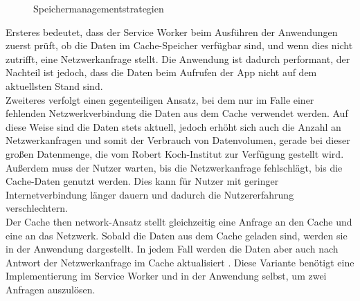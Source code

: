 \begin{figure}
\centering
\caption{Speichermanagementstrategien}
\end{figure}

Ersteres bedeutet, dass der Service Worker beim Ausführen der Anwendungen zuerst prüft, ob die Daten im Cache-Speicher verfügbar sind, und wenn dies nicht zutrifft, eine Netzwerkanfrage stellt.
Die Anwendung ist dadurch performant, der Nachteil ist jedoch, dass die Daten beim Aufrufen der App nicht auf dem aktuellsten Stand sind.\\
Zweiteres verfolgt einen gegenteiligen Ansatz, bei dem nur im Falle einer fehlenden Netzwerkverbindung die Daten aus dem Cache verwendet werden.
Auf diese Weise sind die Daten stets aktuell, jedoch erhöht sich auch die Anzahl an Netzwerkanfragen und somit der Verbrauch von Datenvolumen, gerade bei dieser großen Datenmenge, die vom Robert Koch-Institut zur Verfügung gestellt wird.
Außerdem muss der Nutzer warten, bis die Netzwerkanfrage fehlschlägt, bis die Cache-Daten genutzt werden.
Dies kann für Nutzer mit geringer Internetverbindung länger dauern und dadurch die Nutzererfahrung verschlechtern.\\
Der \glqq Cache then network\grqq{}-Ansatz stellt gleichzeitig eine Anfrage an den Cache und eine an das Netzwerk.
Sobald die Daten aus dem Cache geladen sind, werden sie in der Anwendung dargestellt.
In jedem Fall werden die Daten aber auch nach Antwort der Netzwerkanfrage im Cache aktualisiert \cite{Archibald.2020}.
Diese Variante benötigt eine Implementierung im Service Worker und in der Anwendung selbst, um zwei Anfragen auszulösen.

